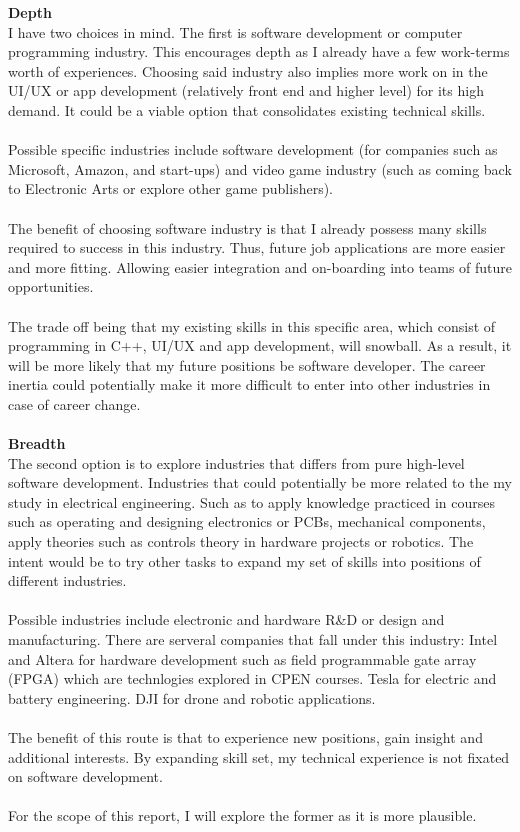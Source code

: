 \documentclass[10pt,letterpaper]{article}
\begin{document}
\textbf{Depth}\\
I have two choices in mind. The first is software development or computer programming industry. This encourages depth as I already have a few work-terms worth of experiences. Choosing said industry also implies more work on in the UI/UX or app development (relatively front end and higher level) for its high demand. It could be a viable option that consolidates existing technical skills.\\
\\
Possible specific industries include software development (for companies such as Microsoft, Amazon, and start-ups) and video game industry (such as coming back to Electronic Arts or explore other game publishers).\\
\\
The benefit of choosing software industry is that I already possess many skills required to success in this industry. Thus, future job applications are more easier and more fitting. Allowing easier integration and on-boarding into teams of future opportunities.\\
\\
The trade off being that my existing skills in this specific area, which consist of programming in C++, UI/UX and app development, will snowball. As a result, it will be more likely that my future positions be software developer. The career inertia could potentially make it more difficult to enter into  other industries in case of career change.\\
\\
\textbf{Breadth}\\
The second option is to explore industries that differs from pure high-level software development. Industries that could potentially be more related to the my study in electrical engineering. Such as to apply knowledge practiced in courses such as operating and designing electronics or PCBs, mechanical components, apply theories such as controls theory in hardware projects or robotics. The intent would be to try other tasks to expand my set of skills into positions of different industries.\\
\\
Possible industries include electronic and hardware R\&D or design and manufacturing. There are serveral companies that fall under this industry: Intel and Altera for hardware development such as field programmable gate array (FPGA) which are technlogies explored in CPEN courses. Tesla for electric and battery engineering. DJI for drone and robotic applications.\\
\\
The benefit of this route is that to experience new positions, gain insight and additional interests. By expanding skill set, my technical experience is not fixated on software development.\\
\\
For the scope of this report, I will explore the former as it is more plausible.\\
\\
\end{document}
